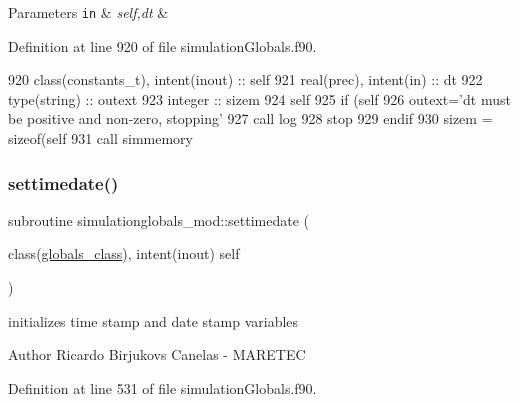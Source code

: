 \begin{DoxyParams}[1]{Parameters}
\mbox{\tt in}  & {\em self,dt} & \\
\hline
\end{DoxyParams}


Definition at line 920 of file simulation\+Globals.\+f90.


\begin{DoxyCode}
920     \textcolor{keywordtype}{class}(constants\_t), \textcolor{keywordtype}{intent(inout)} :: self
921     \textcolor{keywordtype}{real(prec)}, \textcolor{keywordtype}{intent(in)} :: dt
922     \textcolor{keywordtype}{type}(string) :: outext
923     \textcolor{keywordtype}{integer} :: sizem
924     self%
925     \textcolor{keywordflow}{if} (self%
926         outext=\textcolor{stringliteral}{'dt must be positive and non-zero, stopping'}
927         \textcolor{keyword}{call }log%
928         stop
929 \textcolor{keywordflow}{    endif}
930     sizem = sizeof(self%
931     \textcolor{keyword}{call }simmemory%
\end{DoxyCode}
\mbox{\label{namespacesimulationglobals__mod_aefda4344f03a705055ad6cb97cb90c65}} 
\subsubsection{\texorpdfstring{settimedate()}{settimedate()}}
{\footnotesize\ttfamily subroutine simulationglobals\+\_\+mod\+::settimedate (\begin{DoxyParamCaption}\item[{class(\mbox{\hyperlink{structsimulationglobals__mod_1_1globals__class}{globals\+\_\+class}}), intent(inout)}]{self }\end{DoxyParamCaption})\hspace{0.3cm}{\ttfamily [private]}}



initializes time stamp and date stamp variables 

\begin{DoxyAuthor}{Author}
Ricardo Birjukovs Canelas -\/ M\+A\+R\+E\+T\+EC 
\end{DoxyAuthor}


Definition at line 531 of file simulation\+Globals.\+f90.


